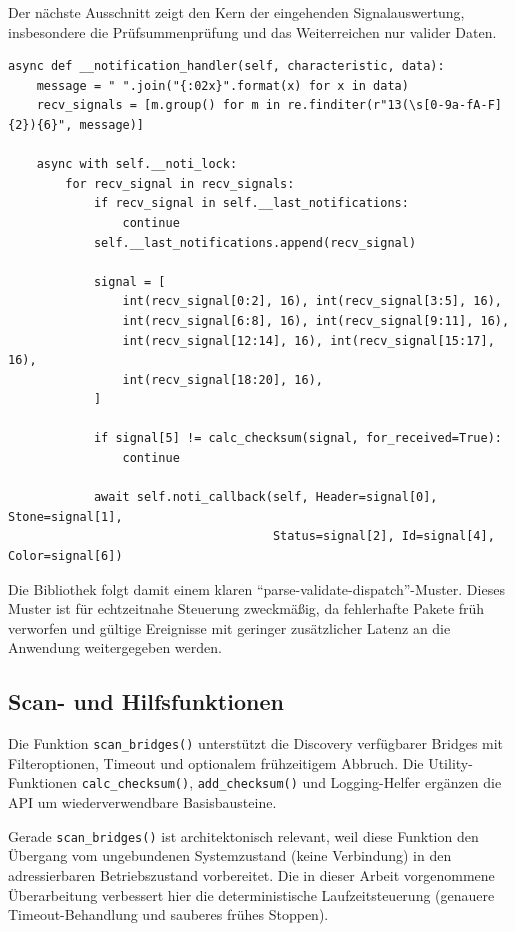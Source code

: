 Der nächste Ausschnitt zeigt den Kern der eingehenden Signalauswertung, insbesondere die Prüfsummenprüfung und das Weiterreichen nur valider Daten.

\begin{listing}[ht]
\caption{Auszug: Validierung eingehender Notifications}
\label{lst:notification-handler}
\begin{verbatim}
async def __notification_handler(self, characteristic, data):
	message = " ".join("{:02x}".format(x) for x in data)
	recv_signals = [m.group() for m in re.finditer(r"13(\s[0-9a-fA-F]{2}){6}", message)]

	async with self.__noti_lock:
		for recv_signal in recv_signals:
			if recv_signal in self.__last_notifications:
				continue
			self.__last_notifications.append(recv_signal)

			signal = [
				int(recv_signal[0:2], 16), int(recv_signal[3:5], 16),
				int(recv_signal[6:8], 16), int(recv_signal[9:11], 16),
				int(recv_signal[12:14], 16), int(recv_signal[15:17], 16),
				int(recv_signal[18:20], 16),
			]

			if signal[5] != calc_checksum(signal, for_received=True):
				continue

			await self.noti_callback(self, Header=signal[0], Stone=signal[1],
									 Status=signal[2], Id=signal[4], Color=signal[6])
\end{verbatim}
\end{listing}

Die Bibliothek folgt damit einem klaren \enquote{parse-validate-dispatch}-Muster.
Dieses Muster ist für echtzeitnahe Steuerung zweckmäßig, da fehlerhafte Pakete früh verworfen und gültige Ereignisse mit geringer zusätzlicher Latenz an die Anwendung weitergegeben werden.

\subsection{Scan- und Hilfsfunktionen}
Die Funktion \texttt{scan\_bridges()} unterstützt die Discovery verfügbarer Bridges mit Filteroptionen, Timeout und optionalem frühzeitigem Abbruch.
Die Utility-Funktionen \texttt{calc\_checksum()}, \texttt{add\_checksum()} und Logging-Helfer ergänzen die API um wiederverwendbare Basisbausteine.

Gerade \texttt{scan\_bridges()} ist architektonisch relevant, weil diese Funktion den Übergang vom ungebundenen Systemzustand (keine Verbindung) in den adressierbaren Betriebszustand vorbereitet.
Die in dieser Arbeit vorgenommene Überarbeitung verbessert hier die deterministische Laufzeitsteuerung (genauere Timeout-Behandlung und sauberes frühes Stoppen).

